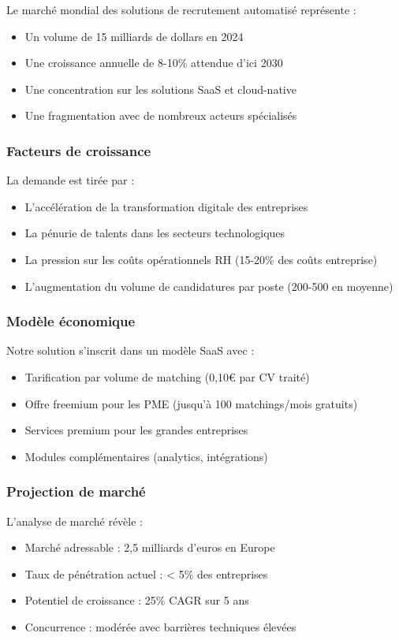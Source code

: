 \documentclass[12pt,a4paper]{report}
\begin{document}
Le marché mondial des solutions de recrutement automatisé représente :
\begin{itemize}
\item Un volume de 15 milliards de dollars en 2024
\item Une croissance annuelle de 8-10\% attendue d'ici 2030
\item Une concentration sur les solutions SaaS et cloud-native
\item Une fragmentation avec de nombreux acteurs spécialisés
\end{itemize}

\subsubsection{Facteurs de croissance}

La demande est tirée par :
\begin{itemize}
\item L'accélération de la transformation digitale des entreprises
\item La pénurie de talents dans les secteurs technologiques
\item La pression sur les coûts opérationnels RH (15-20\% des coûts entreprise)
\item L'augmentation du volume de candidatures par poste (200-500 en moyenne)
\end{itemize}

\subsubsection{Modèle économique}

Notre solution s'inscrit dans un modèle SaaS avec :
\begin{itemize}
\item Tarification par volume de matching (0,10€ par CV traité)
\item Offre freemium pour les PME (jusqu'à 100 matchings/mois gratuits)
\item Services premium pour les grandes entreprises
\item Modules complémentaires (analytics, intégrations)
\end{itemize}

\subsubsection{Projection de marché}

L'analyse de marché révèle :
\begin{itemize}
\item Marché adressable : 2,5 milliards d'euros en Europe
\item Taux de pénétration actuel : < 5\% des entreprises
\item Potentiel de croissance : 25\% CAGR sur 5 ans
\item Concurrence : modérée avec barrières techniques élevées
\end{itemize}
\end{document}
